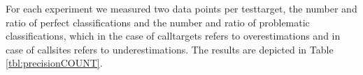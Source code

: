 For each experiment we measured two data points per testtarget, the number and ratio of perfect classifications and the number and ratio of problematic classifications, which in the case of calltargets refers to overestimations and in case of callsites refers to underestimations. The results are depicted in Table \ref{tbl:precisionCOUNT}.
\begin{table}[h!]
		\caption {The results for analysis using the union combination operator for the \textit{count} policy on the O2 optimization level.}
		\label{tbl:precisionCOUNT}
\end{table}~\\
